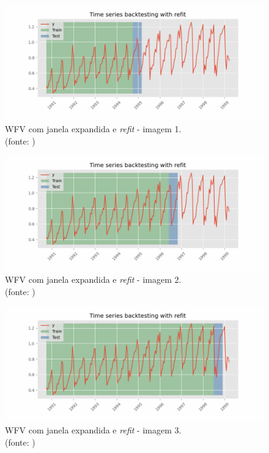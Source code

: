\begin{figure}[!h]
	\centering
	\includegraphics[scale=0.3]{Figuras/imagem1_skforecast-backtesting-refit.png}
	\caption{WFV com janela expandida e \textit{refit} - imagem 1.\\(fonte: \cite{skforecast_a})}
	\label{fig:imagem1_skforecast-backtesting-refit}
\end{figure}

\begin{figure}[!h]
	\centering
	\includegraphics[scale=0.3]{Figuras/imagem2_skforecast-backtesting-refit.png}
	\caption{WFV com janela expandida e \textit{refit} - imagem 2.\\(fonte: \cite{skforecast_a})}
	\label{fig:imagem2_skforecast-backtesting-refit}
\end{figure}

\begin{figure}[!h]
	\centering
	\includegraphics[scale=0.3]{Figuras/imagem3_skforecast-backtesting-refit.png}
	\caption{WFV com janela expandida e \textit{refit} - imagem 3.\\(fonte: \cite{skforecast_a})}
	\label{fig:imagem3_skforecast-backtesting-refit}
\end{figure}

